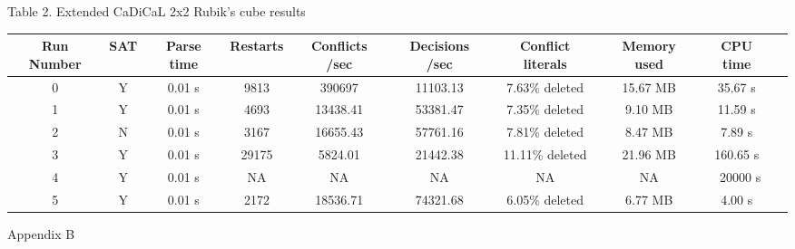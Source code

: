 \documentclass{article}
\begin{document}
\begin{center}
Table 2. Extended CaDiCaL 2x2 Rubik's cube results \\[1mm]
\end{center}
\begin{adjustwidth}{-3.5cm}{}
\begin{tabular}{|c|c|c|c|c|c|c|c|c|c|}
\hline
Run Number & SAT & Parse time & Restarts & Conflicts /sec & Decisions /sec & Conflict literals & Memory used & CPU time \\
\hline
0 & Y & 0.01 s & 9813 & 390697 & 11103.13 & 7.63\% deleted & 15.67 MB & 35.67 s \\
\hline
1 & Y & 0.01 s & 4693 & 13438.41 & 53381.47 & 7.35\% deleted & 9.10 MB & 11.59 s \\
\hline
2 & N & 0.01 s & 3167 & 16655.43 & 57761.16 & 7.81\% deleted & 8.47 MB & 7.89 s \\
\hline
3 & Y & 0.01 s & 29175 & 5824.01 & 21442.38 & 11.11\% deleted & 21.96 MB & 160.65 s \\
\hline
4 & Y & 0.01 s & NA & NA & NA & NA & NA & $\>$ 20000 s \\
\hline
5 & Y & 0.01 s & 2172 & 18536.71 & 74321.68 & 6.05\% deleted & 6.77 MB & 4.00 s \\
\hline
\end{tabular}
\end{adjustwidth}

\pagebreak
\begin{center}
Appendix B
\end{center}

\end{document}
